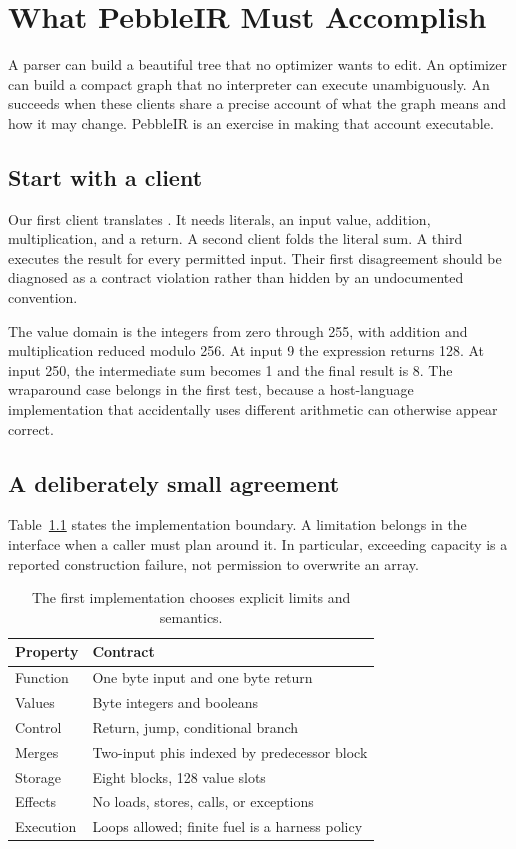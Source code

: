 \chapter{What PebbleIR Must Accomplish}
\label{ch:pebble-purpose}

A parser can build a beautiful tree that no optimizer wants to edit.
An optimizer can build a compact graph that no interpreter can execute unambiguously.
An  succeeds when these clients share a precise account of what the graph means and how it may change.
PebbleIR is an exercise in making that account executable.

\section{Start with a client}
\label{sec:pebble-client}
Our first client translates .
It needs literals, an input value, addition, multiplication, and a return.
A second client folds the literal sum.
A third executes the result for every permitted input.
Their first disagreement should be diagnosed as a contract violation rather than hidden by an undocumented convention.

The value domain is the integers from zero through 255, with addition and multiplication reduced modulo 256.
At input 9 the expression returns 128.
At input 250, the intermediate sum becomes 1 and the final result is 8.
The wraparound case belongs in the first test, because a host-language implementation that accidentally uses different arithmetic can otherwise appear correct.

\section{A deliberately small agreement}
\label{sec:pebble-scope}
Table~\ref{tab:pebble-scope} states the implementation boundary.
A limitation belongs in the interface when a caller must plan around it.
In particular, exceeding capacity is a reported construction failure, not permission to overwrite an array.

\begin{table}[htbp]
\caption{The first implementation chooses explicit limits and semantics.}
\label{tab:pebble-scope}
\centering
\begin{tabular}{ll}
\toprule
Property & Contract \\
\midrule
Function & One byte input and one byte return \\
Values & Byte integers and booleans \\
Control & Return, jump, conditional branch \\
Merges & Two-input phis indexed by predecessor block \\
Storage & Eight blocks, 128 value slots \\
Effects & No loads, stores, calls, or exceptions \\
Execution & Loops allowed; finite fuel is a harness policy \\
\bottomrule
\end{tabular}
\end{table}

